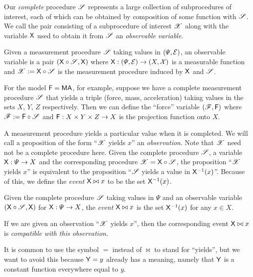 Our \emph{complete} procedure $\mathscr{S}$ represents a large collection of subprocedures of interest, each of which can be obtained by composition of some function with $\mathscr{S}$. We call the pair consisting of a subprocedure of interest $\mathscr{X}$ along with the variable $\mathsf{X}$ used to obtain it from $\mathscr{S}$ an \emph{observable variable}.

\begin{definition}
Given a measurement procedure $\mathscr{S}$ taking values in $(\Psi,\mathcal{E})$, an observable variable is a pair $(\mathsf{X}\circ \mathscr{S},\mathsf{X})$ where $\mathsf{X}:(\Psi,\mathcal{E})\to (X,\mathcal{X})$ is a measurable function and $\mathscr{X}:=\mathsf{X}\circ \mathscr{S}$ is the measurement procedure induced by $\mathsf{X}$ and $\mathscr{S}$.
\end{definition}

For the model $\mathsf{F}=\mathsf{MA}$, for example, suppose we have a complete measurement procedure $\mathscr{S}$ that yields a triple (force, mass, acceleration) taking values in the sets $X$, $Y$, $Z$ respectively. Then we can define the ``force'' variable $(\mathscr{F},\mathsf{F})$ where $\mathscr{F}:=\mathsf{F}\circ \mathscr{S}$ and $\mathsf{F}:X\times Y\times Z\to X$ is the projection function onto $X$.

A measurement procedure yields a particular value when it is completed. We will call a proposition of the form ``$\mathscr{X}$ yields $x$'' an \emph{observation}. Note that $\mathscr{X}$ need not be a complete procedure here. Given the complete procedure $\mathscr{S}$, a variable $\mathsf{X}:\Psi\to X$ and the corresponding procedure $\mathscr{X}=\mathsf{X}\circ\mathscr{S}$, the proposition ``$\mathscr{X}$ yields $x$'' is equivalent to the proposition ``$\mathscr{S}$ yields a value in $\mathsf{X}^{-1}(x)$''. Because of this, we define the \emph{event} $\mathsf{X}\bowtie x$ to be the set $\mathsf{X}^{-1}(x)$.

\begin{definition}[Event]
Given the complete procedure $\mathscr{S}$ taking values in $\Psi$ and an observable variable $(\mathsf{X}\circ \mathscr{S},\mathsf{X})$ for $\mathsf{X}:\Psi\to X$, the \emph{event} $\mathsf{X}\bowtie x$ is the set $\mathsf{X}^{-1}(x)$ for any $x\in X$.
\end{definition}

If we are given an observation ``$\mathscr{X}$ yields $x$'', then the corresponding event $\mathsf{X}\bowtie x$ is \emph{compatible with this observation}.

It is common to use the symbol $=$ instead of $\bowtie$ to stand for ``yields'', but we want to avoid this because $\mathsf{Y}=y$ already has a meaning, namely that $\mathsf{Y}$ is a constant function everywhere equal to $y$.

